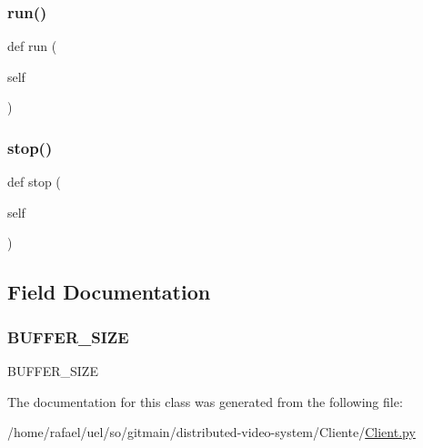 \subsubsection{\texorpdfstring{run()}{run()}}
{\footnotesize\ttfamily def run (\begin{DoxyParamCaption}\item[{}]{self }\end{DoxyParamCaption})}

\mbox{\label{class_client_1_1_client_sender_a26ca7c1c7fcdd35378e7be97727047a6}} 
\subsubsection{\texorpdfstring{stop()}{stop()}}
{\footnotesize\ttfamily def stop (\begin{DoxyParamCaption}\item[{}]{self }\end{DoxyParamCaption})}



\subsection{Field Documentation}
\mbox{\label{class_client_1_1_client_sender_aa300d171bb6f6573a2de65c5342303c9}} 
\subsubsection{\texorpdfstring{B\+U\+F\+F\+E\+R\+\_\+\+S\+I\+ZE}{BUFFER\_SIZE}}
{\footnotesize\ttfamily B\+U\+F\+F\+E\+R\+\_\+\+S\+I\+ZE}



The documentation for this class was generated from the following file\+:\begin{DoxyCompactItemize}
\item 
/home/rafael/uel/so/gitmain/distributed-\/video-\/system/\+Cliente/\hyperlink{_client_8py}{Client.\+py}\end{DoxyCompactItemize}
